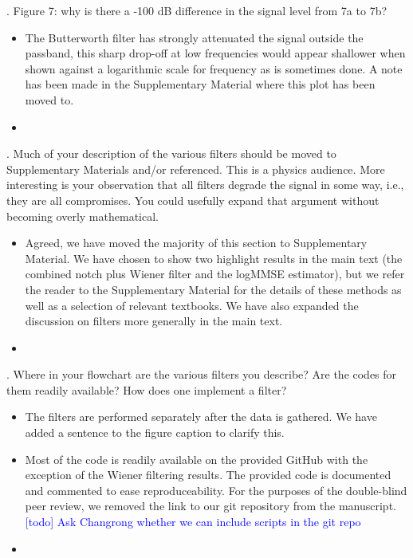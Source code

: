 \documentclass{article}
\newcommand{\todo}{\textcolor{blue}}
\begin{document}
. Figure 7: why is there a -100 dB difference in the signal level from 7a to 7b?  
\begin{itemize}
\item The Butterworth filter has strongly attenuated the signal outside the passband, this sharp drop-off at low frequencies would appear shallower when shown against a logarithmic scale for frequency as is sometimes done. A note has been made in the Supplementary Material where this plot has been moved to.
\item[]
\end{itemize}


. Much of your description of the various filters should be moved to Supplementary Materials and/or referenced.  This is a physics audience.  More interesting is your observation that all filters degrade the signal in some way, i.e., they are all compromises.  You could usefully expand that argument without becoming overly mathematical.
\begin{itemize}
\item Agreed, we have moved the majority of this section to Supplementary Material. We have chosen to show two highlight results in the main text (the combined notch plus Wiener filter and the logMMSE estimator), but we refer the reader to the Supplementary Material for the details of these methods as well as a selection of relevant textbooks. We have also expanded the discussion on filters more generally in the main text. 
\item[]
\end{itemize}


. Where in your flowchart are the various filters you describe?  Are the codes for them readily available?  How does one implement a filter?  
\begin{itemize}
\item The filters are performed separately after the data is gathered. We have added a sentence to the figure caption to clarify this. 
\item Most of the code is readily available on the provided GitHub with the exception of the Wiener filtering results. The provided code is documented and commented to ease reproduceability. For the purposes of the double-blind peer review, we removed the link to our git repository from the manuscript. \todo{[todo] Ask Changrong whether we can include scripts in the git repo}
\item[]
\end{itemize}
\end{document}

